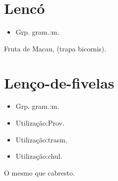 \section{Lencó}
\begin{itemize}
\item {Grp. gram.:m.}
\end{itemize}
Fruta de Macau, (\textunderscore trapa bicornis\textunderscore ).
\section{Lenço-de-fivelas}
\begin{itemize}
\item {Grp. gram.:m.}
\end{itemize}
\begin{itemize}
\item {Utilização:Prov.}
\end{itemize}
\begin{itemize}
\item {Utilização:trasm.}
\end{itemize}
\begin{itemize}
\item {Utilização:chul.}
\end{itemize}
O mesmo que \textunderscore cabresto\textunderscore .
